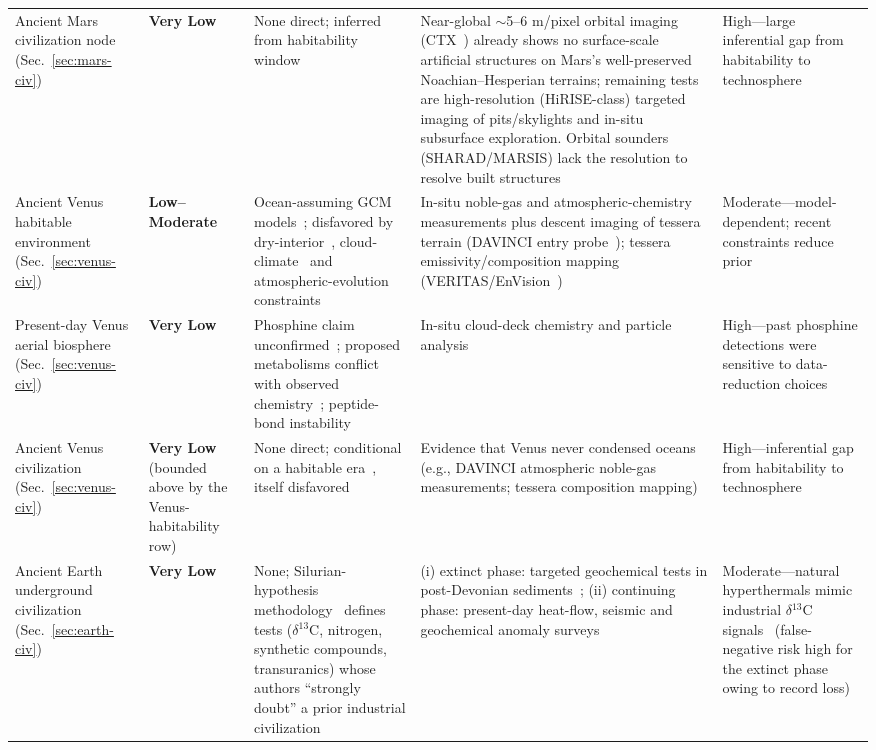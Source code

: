 \documentclass[aps,prd,twocolumn,superscriptaddress,nofootinbib]{revtex4-2}
\begin{document}
\begin{table}[htbp]
\begin{tabular}{P{0.155\textwidth}P{0.090\textwidth}P{0.204\textwidth}P{0.244\textwidth}P{0.155\textwidth}}
Ancient Mars civilization node (Sec.~\ref{sec:mars-civ}) & \textbf{Very Low} & None direct; inferred from habitability window & Near-global ${\sim}$5--6 m/pixel orbital imaging (CTX~\cite{Dickson2024}) already shows no surface-scale artificial structures on Mars's well-preserved Noachian--Hesperian terrains; remaining tests are high-resolution (HiRISE-class) targeted imaging of pits/skylights and in-situ subsurface exploration. Orbital sounders (SHARAD/MARSIS) lack the resolution to resolve built structures & High---large inferential gap from habitability to technosphere \\
Ancient Venus habitable environment (Sec.~\ref{sec:venus-civ}) & \textbf{Low--Moderate} & Ocean-assuming GCM models~\cite{Way2016,Way2020}; disfavored by dry-interior~\cite{Constantinou2024}, cloud-climate~\cite{Turbet2021} and atmospheric-evolution~\cite{Warren2023} constraints & In-situ noble-gas and atmospheric-chemistry measurements plus descent imaging of tessera terrain (DAVINCI entry probe~\cite{NASA_DAVINCI}); tessera emissivity/composition mapping (VERITAS/EnVision~\cite{NASA_VERITAS,ESA_EnVision}) & Moderate---model-dependent; recent constraints reduce prior \\
Present-day Venus aerial biosphere (Sec.~\ref{sec:venus-civ}) & \textbf{Very Low} & Phosphine claim unconfirmed~\cite{Snellen2020,Cordiner2022}; proposed metabolisms conflict with observed chemistry~\cite{Jordan2022}; peptide-bond instability~\cite{Petkowski2024dipeptide} & In-situ cloud-deck chemistry and particle analysis & High---past phosphine detections were sensitive to data-reduction choices~\cite{Snellen2020} \\
Ancient Venus civilization (Sec.~\ref{sec:venus-civ}) & \textbf{Very Low} (bounded above by the Venus-habitability row) & None direct; conditional on a habitable era~\cite{Way2016,Way2020}, itself disfavored~\cite{Constantinou2024,Turbet2021,Warren2023} & Evidence that Venus never condensed oceans (e.g., DAVINCI atmospheric noble-gas measurements; tessera composition mapping) & High---inferential gap from habitability to technosphere \\
Ancient Earth underground civilization (Sec.~\ref{sec:earth-civ}) & \textbf{Very Low} & None; Silurian-hypothesis methodology~\cite{Schmidt2019} defines tests ($\delta{}^{13}$C, nitrogen, synthetic compounds, transuranics) whose authors ``strongly doubt'' a prior industrial civilization & (i) extinct phase: targeted geochemical tests in post-Devonian sediments~\cite{Schmidt2019}; (ii) continuing phase: present-day heat-flow, seismic and geochemical anomaly surveys & Moderate---natural hyperthermals mimic industrial $\delta{}^{13}$C signals~\cite{Schmidt2019} (false-negative risk high for the extinct phase owing to record loss) \\

\end{tabular}
\end{table}
\end{document}
